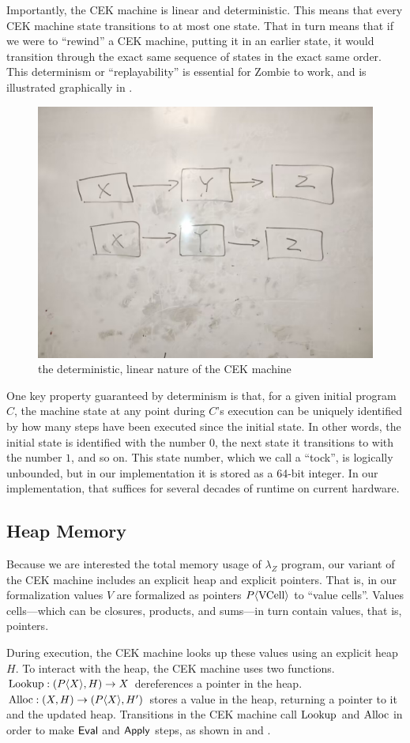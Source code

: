 Importantly, the CEK machine is linear and deterministic. This means
that every CEK machine state transitions to at most one state. That in
turn means that if we were to ``rewind'' a CEK machine, putting it in
an earlier state, it would transition through the exact same sequence
of states in the exact same order. This determinism or
``replayability'' is essential for Zombie to work, and is illustrated
graphically in .

\begin{figure}
\includegraphics[width=0.5\columnwidth]{0}
\caption{the deterministic, linear nature of the CEK machine}
\label{fig:replayability}
\end{figure}

One key property guaranteed by determinism is that, for a given
initial program $C$, the machine state at any point during $C$'s
execution can be uniquely identified by how many steps have been
executed since the initial state. In other words, the initial state is
identified with the number $0$, the next state it transitions to with
the number $1$, and so on. This state number, which we call a
``tock'', is logically unbounded, but in our implementation it is
stored as a 64-bit integer. In our implementation, that suffices for
several decades of runtime on current hardware. 

\subsection{Heap Memory}

Because we are interested the total memory usage of $\lambda_Z$
program, our variant of the CEK machine includes an explicit heap and
explicit pointers. That is, in our formalization values $V$ are
formalized as pointers $P\langle \text{\textnormal{VCell}} \rangle$ to ``value cells''.
Values cells---which can be closures, products, and sums---in turn
contain values, that is, pointers.

During execution, the CEK machine looks up these values using an
explicit heap $H$. To interact with the heap, the CEK machine uses two
functions. $\textrm{Lookup} : (P \langle X \rangle, H) \to X$ dereferences a
pointer in the heap. $\textrm{Alloc} : (X, H) \to (P \langle X \rangle, H')$
stores a value in the heap, returning a pointer to it and the updated
heap. Transitions in the CEK machine call $\textrm{Lookup}$ and $\textrm{Alloc}$ in
order to make $\text{\textsf{Eval}}$ and $\text{\textsf{Apply}}$ steps, as shown in 
and .

